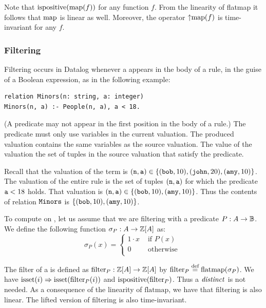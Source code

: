 Note that $\mbox{ispositive}(\mbox{map}(f))$ for any function $f$.  
From the linearity of flatmap it follows that $\mbox{map}$
is linear as well.  Moreover, the operator ${\uparrow}\mbox{map}(f)$ is
time-invariant for any $f$.

\subsubsection{Filtering}\label{sec:filtering}

Filtering occurs in Datalog whenever a  appears in 
the body of a rule, in the guise of a Boolean expression, as in the following example:

\noindent
\begin{lstlisting}[language=ddlog]
relation Minors(n: string, a: integer)
Minors(n, a) :- People(n, a), a < 18.
\end{lstlisting}

(A predicate may not appear in the first position in the body of a rule.)
The predicate must only use variables in the current valuation.
The produced valuation contains the same variables as the source valuation.
The value of the valuation the set of tuples in the source valuation that 
satisfy the predicate. 

Recall that the valuation of the term  is
$(\mbox{\texttt{n}}, \mbox{\texttt{a}}) \in \{ (\mbox{\texttt{bob}}, 10), \\ (\mbox{\texttt{john}}, 20), (\mbox{\texttt{amy}}, 10) \}$.
The valuation of the entire rule is the set of tuples $(\mbox{\texttt{n}}, \mbox{\texttt{a}})$
for which the predicate $\mbox{\texttt{a}} < 18$ holds.  That valuation is
$(\mbox{\texttt{n}}, \mbox{\texttt{a}}) \in \{ (\mbox{\texttt{bob}}, 10), (\mbox{\texttt{amy}}, 10) \}$.  Thus the contents
of relation $\mbox{\texttt{Minors}}$ is $\{ (\mbox{\texttt{bob}}, 10), (\mbox{\texttt{amy}}, 10) \}$.

To compute on \zrs, let us assume that we are filtering with a predicate $P: A \rightarrow \mathbb{B}$.  
We define the following function $\sigma_P: A \rightarrow \mathbb{Z}[A]$ as:
$$\sigma_P(x) = \left\{
\begin{array}{ll}
  1 \cdot x & \mbox{ if } P(x) \\
  0 & \mbox{ otherwise } \\
\end{array}
\right.
$$

The filter of a \zr is defined as $\mbox{filter}_P: \mathbb{Z}[A]
\rightarrow \mathbb{Z}[A]$ by $\mbox{filter}_P \stackrel{\textrm{\scriptsize def}}{=}
\mbox{flatmap}(\sigma_P)$.  We have $\mbox{isset}(i) \Rightarrow
\mbox{isset}(\mbox{filter}_P(i))$ and $\mbox{ispositive}(\mbox{filter}_P)$.  Thus a $\mathit{distinct}$
is not needed.  As a consequence of the linearity of $\mbox{flatmap}$, we have
that filtering is also linear.   The lifted version of filtering is also time-invariant.


